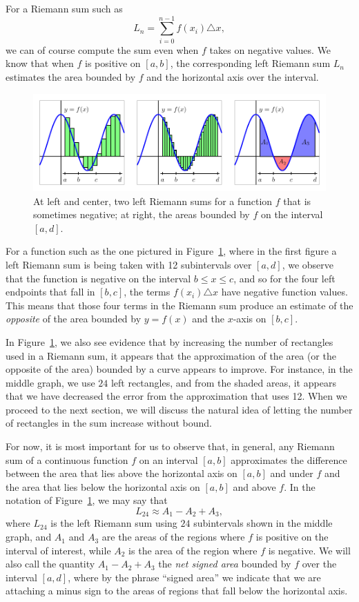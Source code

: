 For a Riemann sum such as 
$$L_n = \sum_{i=0}^{n-1} f(x_i) \triangle x,$$
we can of course compute the sum even when $f$ takes on negative values.  We know that when $f$ is positive on $[a,b]$, the corresponding left Riemann sum $L_n$ estimates the area bounded by $f$ and the horizontal axis over the interval.  
\begin{figure}[h]
\begin{center}
\includegraphics{figures/4_2_NegF}
\caption{At left and center, two left Riemann sums for a function $f$ that is sometimes negative; at right, the areas bounded by $f$ on the interval $[a,d]$.} \label{F:4.2.NegF}
\end{center}
\end{figure}
For a function such as the one pictured in Figure~\ref{F:4.2.NegF}, where in the first figure a left Riemann sum is being taken with 12 subintervals over $[a,d]$, we observe that the function is negative on the interval $b \le x \le c$, and so for the four left endpoints that fall in $[b,c]$, the terms $f(x_i) \triangle x$ have negative function values.  This means that those four terms in the Riemann sum produce an estimate of the \emph{opposite} of the area bounded by $y = f(x)$ and the $x$-axis on $[b,c]$.

In Figure~\ref{F:4.2.NegF}, we also see evidence that by increasing the number of rectangles used in a Riemann sum, it appears that the approximation of the area (or the opposite of the area) bounded by a curve appears to improve.  For instance, in the middle graph, we use $ 24 $ left rectangles, and from the shaded areas, it appears that we have decreased the error from the approximation that uses 12.  When we proceed to the next section, we will discuss the natural idea of letting the number of rectangles in the sum increase without bound.  

For now, it is most important for us to observe that, in general, any Riemann sum of a continuous function $f$ on an interval $[a,b]$ approximates the difference between the area that lies above the horizontal axis on $[a,b]$ and under $f$ and the area that lies below the horizontal axis on $[a,b]$ and above $f$.  In the notation of Figure~\ref{F:4.2.NegF}, we may say that
$$L_{24} \approx A_1 - A_2 + A_3,$$
where $L_{24}$ is the left Riemann sum using $ 24 $ subintervals shown in the middle graph, and $A_1$ and $A_3$ are the areas of the regions where $f$ is positive on the interval of interest, while $A_2$ is the area of the region where $f$ is negative.  We will also call the quantity $A_1 - A_2 + A_3$ the \emph{net signed area}  bounded by $f$ over the interval $[a,d]$, where by the phrase ``signed area'' we indicate that we are attaching a minus sign to the areas of regions that fall below the horizontal axis.

